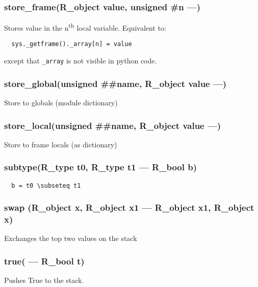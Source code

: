 \subsubsection{store\_frame(R\_object value, unsigned \#n ---)}
\vspace{-1em}Stores value in the n\textsuperscript{th} local variable. Equivalent to: \vspace{-1em}\begin{verbatim}
  sys._getframe()._array[n] = value
\end{verbatim}
\vspace{-1em}except that \texttt{\_array} is not visible in python code. \vspace{-1em}
\subsubsection{store\_global(unsigned \#\#name, R\_object value ---)}
\vspace{-1em}Store to globals (module dictionary) \vspace{-1em}
\subsubsection{store\_local(unsigned \#\#name, R\_object value ---)}
\vspace{-1em}Store to frame locals (as dictionary) \vspace{-1em}
\subsubsection{subtype(R\_type t0, R\_type t1 --- R\_bool b)}
\vspace{-1em}\begin{verbatim}
  b = t0 \subseteq t1
\end{verbatim}
\vspace{-1em}\vspace{-1em}
\subsubsection{swap (R\_object x, R\_object x1 --- R\_object x1, R\_object x)}
\vspace{-1em}Exchanges the top two values on the stack \vspace{-1em}
\subsubsection{true( --- R\_bool t)}
\vspace{-1em}Pushes True to the stack. \vspace{-1em}
